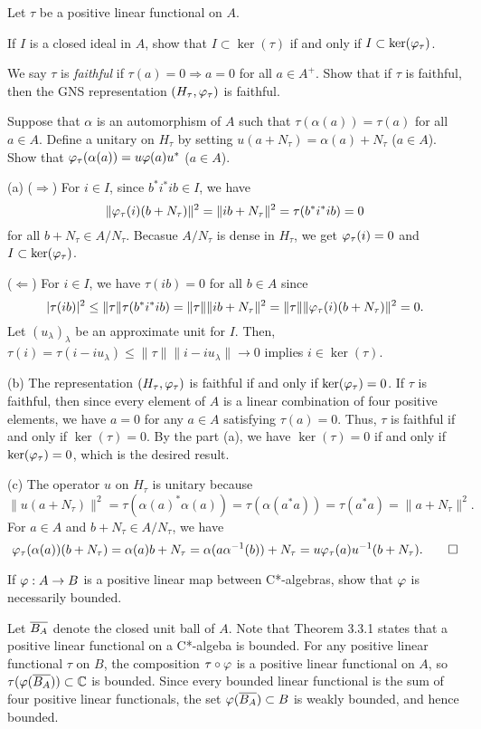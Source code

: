 \documentclass[12pt]{article}
\begin{document}
\begin{prb}
Let $\tau$ be a positive linear functional on $A$.
\begin{parts}
\item
If $I$ is a closed ideal in $A$, show that $I\subset\ker(\tau)$ if and only if $I\subset\ker(\varphi_\tau)$.
\item
We say $\tau$ is \emph{faithful} if $\tau(a)=0\Rightarrow a=0$ for all $a\in A^+$.
Show that if $\tau$ is faithful, then the GNS representation $(H_\tau,\varphi_\tau)$ is faithful.
\item
Suppose that $\alpha$ is an automorphism of $A$ such that $\tau(\alpha(a))=\tau(a)$ for all $a\in A$.
Define a unitary on $H_\tau$ by setting $u(a+N_\tau)=\alpha(a)+N_\tau$ ($a\in A$).
Show that $\varphi_\tau(\alpha(a))=u\varphi(a)u^*$ ($a\in A$).
\end{parts}
\end{prb}
\begin{sol}
(a)
($\Rightarrow$)
For $i\in I$, since $b^*i^*ib\in I$, we have
\[\|\varphi_\tau(i)(b+N_\tau)\|^2=\|ib+N_\tau\|^2=\tau(b^*i^*ib)=0\]
for all $b+N_\tau\in A/N_\tau$.
Becasue $A/N_\tau$ is dense in $H_\tau$, we get $\varphi_\tau(i)=0$ and $I\subset\ker(\varphi_\tau)$.

($\Leftarrow$)
For $i\in I$, we have $\tau(ib)=0$ for all $b\in A$ since
\[|\tau(ib)|^2\le\|\tau\|\tau(b^*i^*ib)=\|\tau\|\|ib+N_\tau\|^2=\|\tau\|\|\varphi_\tau(i)(b+N_\tau)\|^2=0.\]
Let $(u_\lambda)_\lambda$ be an approximate unit for $I$.
Then, $\tau(i)=\tau(i-iu_\lambda)\le\|\tau\|\|i-iu_\lambda\|\to0$ implies $i\in\ker(\tau)$.

(b)
The representation $(H_\tau,\varphi_\tau)$ is faithful if and only if $\ker(\varphi_\tau)=0$.
If $\tau$ is faithful, then since every element of $A$ is a linear combination of four positive elements, we have $a=0$ for any $a\in A$ satisfying $\tau(a)=0$.
Thus, $\tau$ is faithful if and only if $\ker(\tau)=0$.
By the part (a), we have $\ker(\tau)=0$ if and only if $\ker(\varphi_\tau)=0$, which is the desired result.

(c)
The operator $u$ on $H_\tau$ is unitary because
\[\|u(a+N_\tau)\|^2=\tau(\alpha(a)^*\alpha(a))=\tau(\alpha(a^*a))=\tau(a^*a)=\|a+N_\tau\|^2.\]
For $a\in A$ and $b+N_\tau\in A/N_\tau$, we have
\[\varphi_\tau(\alpha(a))(b+N_\tau)=\alpha(a)b+N_\tau=\alpha(a\alpha^{-1}(b))+N_\tau=u\varphi_\tau(a)u^{-1}(b+N_\tau).\qedhere\]
\end{sol}


\begin{prb}
If $\varphi:A\to B$ is a positive linear map between C*-algebras, show that $\varphi$ is necessarily bounded.
\end{prb}
\begin{sol}
Let $\overline{B_A}$ denote the closed unit ball of $A$.
Note that Theorem 3.3.1 states that a positive linear functional on a C*-algeba is bounded.
For any positive linear functional $\tau$ on $B$, the composition $\tau\circ\varphi$ is a positive linear functional on $A$, so $\tau(\varphi(\overline{B_A}))\subset\mathbb{C}$ is bounded.
Since every bounded linear functional is the sum of four positive linear functionals, the set $\varphi(\overline{B_A})\subset B$ is weakly bounded, and hence bounded.
\end{sol}
\end{document}
